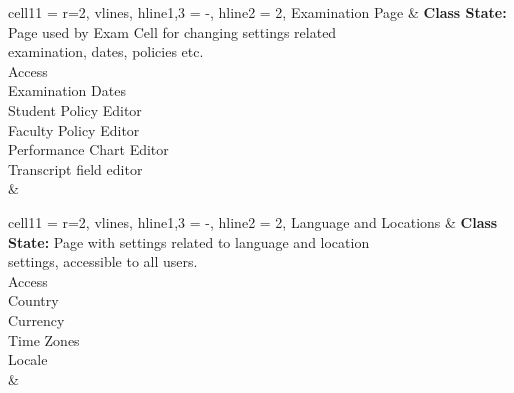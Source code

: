 \documentclass[11pt]{article}
\begin{document}
\begin{longtblr}[
  label = none,
  entry = none,
]{
  cell{1}{1} = {r=2}{},
  vlines,
  hline{1,3} = {-}{},
  hline{2} = {2}{},
}
Examination Page & {\textbf{Class State: }Page used by Exam Cell for changing settings related \\
examination, dates, policies etc.\\
\hspace{\dimexpr\labelsep+0.5\tabcolsep}Access\\
\hspace{\dimexpr\labelsep+0.5\tabcolsep}Examination Dates\\
\hspace{\dimexpr\labelsep+0.5\tabcolsep}Student Policy Editor\\
\hspace{\dimexpr\labelsep+0.5\tabcolsep}Faculty Policy Editor\\
\hspace{\dimexpr\labelsep+0.5\tabcolsep}Performance Chart Editor\\
\hspace{\dimexpr\labelsep+0.5\tabcolsep}Transcript field editor} \\
                 &
\end{longtblr}


\begin{longtblr}[
  label = none,
  entry = none,
]{
  cell{1}{1} = {r=2}{},
  vlines,
  hline{1,3} = {-}{},
  hline{2} = {2}{},
}
Language and Locations & {\textbf{Class State: }Page with settings related to language and location
\\settings, accessible to all users.\\
\hspace{\dimexpr\labelsep+0.5\tabcolsep}Access\\
\hspace{\dimexpr\labelsep+0.5\tabcolsep}Country\\
\hspace{\dimexpr\labelsep+0.5\tabcolsep}Currency\\
\hspace{\dimexpr\labelsep+0.5\tabcolsep}Time Zones\\
\hspace{\dimexpr\labelsep+0.5\tabcolsep}Locale} \\
                       &
\end{longtblr}
\end{document}
